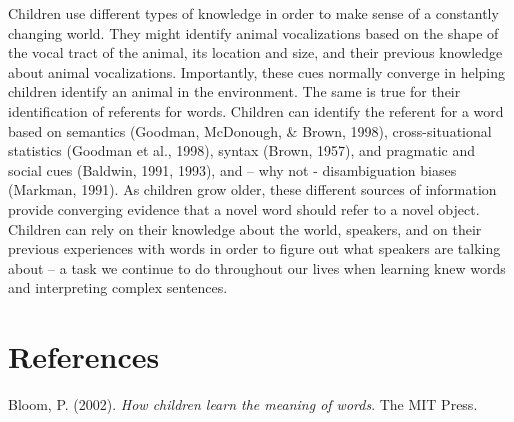 \documentclass[english,floatsintext,man]{apa6}
\theoremstyle{definition}
\theoremstyle{definition}
\theoremstyle{definition}
\theoremstyle{remark}
\begin{document}
Children use different types of knowledge in order to make sense of a
constantly changing world. They might identify animal vocalizations
based on the shape of the vocal tract of the animal, its location and
size, and their previous knowledge about animal vocalizations.
Importantly, these cues normally converge in helping children identify
an animal in the environment. The same is true for their identification
of referents for words. Children can identify the referent for a word
based on semantics (Goodman, McDonough, \& Brown, 1998),
cross-situational statistics (Goodman et al., 1998), syntax (Brown,
1957), and pragmatic and social cues (Baldwin, 1991, 1993), and -- why
not - disambiguation biases (Markman, 1991). As children grow older,
these different sources of information provide converging evidence that
a novel word should refer to a novel object. Children can rely on their
knowledge about the world, speakers, and on their previous experiences
with words in order to figure out what speakers are talking about -- a
task we continue to do throughout our lives when learning knew words and
interpreting complex sentences.

\newpage

\section{References}\label{references}

\setlength{\parindent}{-0.5in} \setlength{\leftskip}{0.5in}

\hypertarget{refs}{}
\hypertarget{ref-bloom2002children}{}
Bloom, P. (2002). \emph{How children learn the meaning of words}. The
MIT Press.
\end{document}
